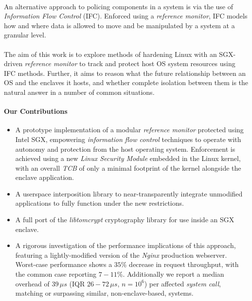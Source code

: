 \paragraph{} An alternative approach to policing components in a system is via the use of \textit{Information Flow Control} (IFC). Enforced using a \textit{reference monitor}, IFC models how and where data is allowed to move and be manipulated by a system at a granular level.

\paragraph{} The aim of this work is to explore methods of hardening Linux with an SGX-driven \textit{reference monitor} to track and protect host OS system resources using IFC methods. Further, it aims to reason what the future relationship between an OS and the enclaves it hosts, and whether complete isolation between them is the natural answer in a number of common situations.


\paragraph{Our Contributions}
\begin{itemize}
    \item A prototype implementation of a modular \textit{reference monitor} protected using Intel SGX, empowering \textit{information flow control} techniques to operate with autonomy and protection from the host operating system. Enforcement is achieved using a new \textit{Linux Security Module} embedded in the Linux kernel, with an overall \textit{TCB} of only a minimal footprint of the kernel alongside the enclave application.
    \item A userspace interposition library to near-transparently integrate unmodified applications to fully function under the new restrictions.
    \item A full port of the \textit{libtomcrypt} cryptography library for use inside an SGX enclave.
    \item A rigorous investigation of the performance implications of this approach, featuring a lightly-modified version of the \textit{Nginx} production webserver. Worst-case performance shows a $35$\% decrease in request throughput, with the common case reporting $7-11$\%. Additionally we report a median overhead of $39\,\mu s$ (IQR $26-72\,\mu s$, $n = 10^6$) per affected \textit{system call}, matching or surpassing similar, non-enclave-based, systems.
\end{itemize}